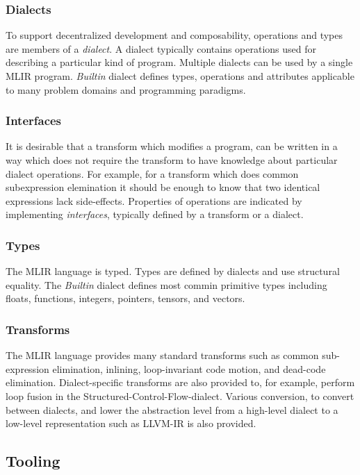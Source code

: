 \subsubsection{Dialects}

To support decentralized development and composability, operations and
types are members of a \textit{dialect}. A dialect typically contains
operations used for describing a particular kind of program. Multiple
dialects can be used by a single MLIR program. \textit{Builtin}
dialect defines types, operations and attributes applicable to many
problem domains and programming paradigms.

\subsubsection{Interfaces}

It is desirable that a transform which modifies a program, can be
written in a way which does not require the transform to have
knowledge about particular dialect operations. For example, for a
transform which does common subexpression elemination it should be
enough to know that two identical expressions lack
side-effects. Properties of operations are indicated by implementing
\textit{interfaces}, typically defined by a transform or a dialect.

\subsubsection{Types}

The MLIR language is typed. Types are defined by dialects and use
structural equality. The \textit{Builtin} dialect defines most commin
primitive types including floats, functions, integers, pointers,
tensors, and vectors.

\subsubsection{Transforms}

The MLIR language provides many standard transforms such as common
sub-expression elimination, inlining, loop-invariant code motion, and
dead-code elimination. Dialect-specific transforms are also provided
to, for example, perform loop fusion in the
Structured-Control-Flow-dialect. Various conversion, to convert
between dialects, and lower the abstraction level from a high-level
dialect to a low-level representation such as LLVM-IR is also
provided.

\subsection{Tooling}

